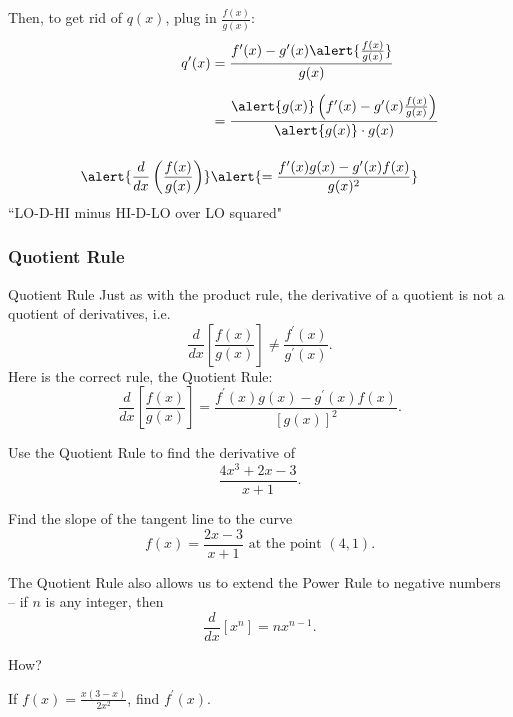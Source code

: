 \documentclass[cal1spr16Lectures.tex]{subfiles}
\begin{document}
\begin{frame}{}\footnotesize
Then, to get rid of $q(x)$, plug in $\frac{f(x)}{g(x)}$:
\begin{align*}
q^{\prime}(x) &= \frac{f^{\prime}(x)-g^{\prime}(x)\alert{\frac{f(x)}{g(x)}}}{g(x)} \\[0.5pc]
 &= \frac{\alert{g(x)} \left( f^{\prime}(x)-g^{\prime}(x)\frac{f(x)}{g(x)} \right)}{\alert{g(x)}\cdot g(x)} \\[1pc]
\alert{\frac{d}{dx}\left(\frac{f(x)}{g(x)}\right)} & \alert{=\frac{f^{\prime}(x) g(x)-g^{\prime}(x)f(x)}{g(x)^2}}
\end{align*}
``LO-D-HI minus HI-D-LO  over LO squared"
\end{frame}

\subsubsection{Quotient Rule}

\begin{frame}{\small Quotient Rule}
Just as with the product rule, the derivative of a quotient is not a quotient of derivatives, i.e.
\[\frac{d}{dx} \left[ \frac{f(x)}{g(x)}\right] \ne \frac{f^{\prime}(x)}{g^{\prime}(x)}.\]
Here is the correct rule, the Quotient Rule:
\[\frac{d}{dx} \left[ \frac{f(x)}{g(x)}\right] = \frac{f^{\prime}(x) g(x)-g^{\prime}(x) f(x)}{[g(x)]^2}.\]
\end{frame}

\begin{frame}
\begin{exe} Use the Quotient Rule to find the derivative of 
\[\frac{4x^3+2x-3}{x+1}.\]
\end{exe}
\begin{exe} Find the slope of the tangent line to the curve 
\[f(x)=\frac{2x-3}{x+1}\text{ at the point }(4,1).\] 
\end{exe}
\end{frame}

\begin{frame}{}
The Quotient Rule also allows us to extend the Power Rule to negative numbers -- if $n$ is any integer, then 
\[\frac{d}{dx}\left[ x^n \right] = nx^{n-1}.\]
\begin{que} How? \end{que}
\end{frame}

\begin{frame}
\begin{exe} If $f(x)=\frac{x(3-x)}{2x^2}$, find $f^{\prime}(x).$ \end{exe}
\end{frame}
\end{document}
